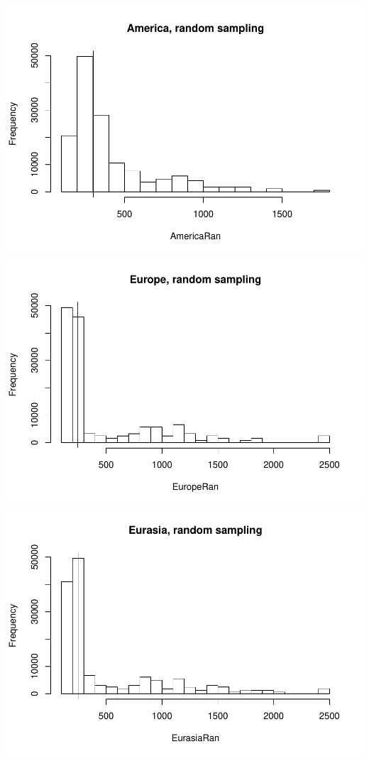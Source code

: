 \includegraphics{MA_JJ_files/figure-latex/RSCon-1.pdf}
\includegraphics{MA_JJ_files/figure-latex/RSCon-2.pdf}
\includegraphics{MA_JJ_files/figure-latex/RSCon-3.pdf}